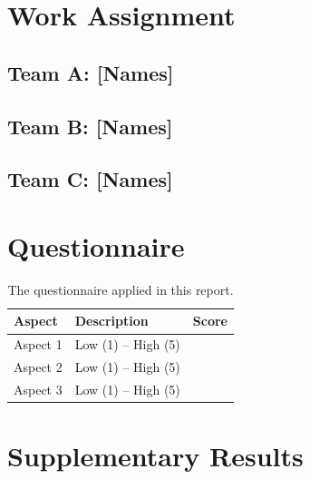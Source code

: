 \documentclass[11pt]{article}
\newif\ifguidance
\newcommand{\guidance}[1]{\ifguidance\textcolor{blue}{\small\textit{[#1]}}\fi}
\begin{document}
\section{Work Assignment}
\label{app:work}

\guidance{%
  Describe each team member's or sub-team's responsibilities. This helps
  the marker understand individual contributions.}

\subsection{Team A: [Names]}

\subsection{Team B: [Names]}

\subsection{Team C: [Names]}


\section{Questionnaire}
\label{app:questionnaire}

\guidance{%
  Include the full questionnaire used in extrinsic evaluation so the
  marker can assess its appropriateness.}

\begin{table}[H]
\centering
\small
\begin{tabular}{llc}
\toprule
\textbf{Aspect} & \textbf{Description} & \textbf{Score} \\
\midrule
Aspect 1 & Low (1) -- High (5) & \\
Aspect 2 & Low (1) -- High (5) & \\
Aspect 3 & Low (1) -- High (5) & \\
\bottomrule
\end{tabular}
\caption{The questionnaire applied in this report.}
\label{tab:questionnaire}
\end{table}


\section{Supplementary Results}
\label{app:supplementary}

\guidance{%
  Include any additional tables, statistical tests (e.g.\ Wilcoxon),
  or detailed breakdowns that support but would clutter the main text.}
\end{document}
